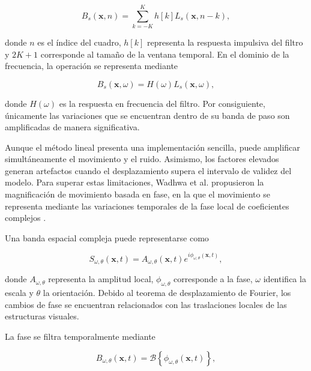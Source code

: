 \begin{equation}
    B_s(\mathbf{x},n)
    =
    \sum_{k=-K}^{K}
    h[k]L_s(\mathbf{x},n-k),
    \label{eq:filtrado_temporal_discreto}
\end{equation}

donde $n$ es el índice del cuadro, $h[k]$ representa la respuesta impulsiva del filtro y $2K+1$ corresponde al tamaño de la ventana temporal. En el dominio de la frecuencia, la operación se representa mediante

\begin{equation}
    B_s(\mathbf{x},\omega)
    =
    H(\omega)L_s(\mathbf{x},\omega),
    \label{eq:filtrado_frecuencia_euleriano}
\end{equation}

donde $H(\omega)$ es la respuesta en frecuencia del filtro. Por consiguiente, únicamente las variaciones que se encuentran dentro de su banda de paso son amplificadas de manera significativa.

Aunque el método lineal presenta una implementación sencilla, puede amplificar simultáneamente el movimiento y el ruido. Asimismo, los factores elevados generan artefactos cuando el desplazamiento supera el intervalo de validez del modelo. Para superar estas limitaciones, Wadhwa et al. propusieron la magnificación de movimiento basada en fase, en la que el movimiento se representa mediante las variaciones temporales de la fase local de coeficientes complejos \cite{wadhwa2013phase}.

Una banda espacial compleja puede representarse como

\begin{equation}
    S_{\omega,\theta}(\mathbf{x},t)
    =
    A_{\omega,\theta}(\mathbf{x},t)
    e^{i\phi_{\omega,\theta}(\mathbf{x},t)},
    \label{eq:representacion_compleja}
\end{equation}

donde $A_{\omega,\theta}$ representa la amplitud local, $\phi_{\omega,\theta}$ corresponde a la fase, $\omega$ identifica la escala y $\theta$ la orientación. Debido al teorema de desplazamiento de Fourier, los cambios de fase se encuentran relacionados con las traslaciones locales de las estructuras visuales.

La fase se filtra temporalmente mediante

\begin{equation}
    B_{\omega,\theta}(\mathbf{x},t)
    =
    \mathcal{B}
    \left\{
        \phi_{\omega,\theta}(\mathbf{x},t)
    \right\},
    \label{eq:filtrado_fase}
\end{equation}

